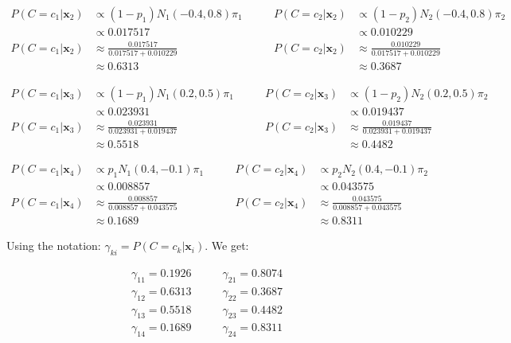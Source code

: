 \documentclass[12pt]{article}
\begin{document}
\begin{enumerate}[leftmargin=\labelsep]
    \begin{equation}
    \begin{aligned}
        P(C=c_1|\mathbf{x}_2) &\propto (1-p_1)N_1(-0.4, 0.8)\pi_1 &\qquad P(C=c_2|\mathbf{x}_2) &\propto (1-p_2)N_2(-0.4, 0.8)\pi_2 \\
        &\propto 0.017517 &\qquad &\propto 0.010229 \\
        P(C=c_1|\mathbf{x}_2) &\approx \frac{0.017517}{0.017517+0.010229} &\qquad P(C=c_2|\mathbf{x}_2) &\approx \frac{0.010229}{0.017517+0.010229} \\
        &\approx 0.6313 &\qquad &\approx 0.3687
    \end{aligned}
    \end{equation}

    \begin{equation}
    \begin{aligned}
        P(C=c_1|\mathbf{x}_3) &\propto (1-p_1)N_1(0.2, 0.5)\pi_1 &\qquad P(C=c_2|\mathbf{x}_3) &\propto (1-p_2)N_2(0.2, 0.5)\pi_2 \\
        &\propto 0.023931 &\qquad &\propto 0.019437 \\
        P(C=c_1|\mathbf{x}_3) &\approx \frac{0.023931}{0.023931+0.019437} &\qquad P(C=c_2|\mathbf{x}_3) &\approx \frac{0.019437}{0.023931+0.019437} \\
        &\approx 0.5518 &\qquad &\approx 0.4482
    \end{aligned}
    \end{equation}

    \begin{equation}
    \begin{aligned}
        P(C=c_1|\mathbf{x}_4) &\propto p_1N_1(0.4, -0.1)\pi_1 &\qquad P(C=c_2|\mathbf{x}_4) &\propto p_2N_2(0.4, -0.1)\pi_2 \\
        &\propto 0.008857 &\qquad &\propto 0.043575 \\
        P(C=c_1|\mathbf{x}_4) &\approx \frac{0.008857}{0.008857+0.043575} &\qquad P(C=c_2|\mathbf{x}_4) &\approx \frac{0.043575}{0.008857+0.043575} \\
        &\approx 0.1689 &\qquad &\approx 0.8311
    \end{aligned}
    \end{equation}

    \vskip 2cm

    Using the notation: $\gamma_{ki}=P(C = c_k |\mathbf{x}_i)$. We get:

    \begin{equation}
    \begin{aligned}
        \gamma_{11} = 0.1926 &\qquad \gamma_{21} = 0.8074 \\
        \gamma_{12} = 0.6313 &\qquad \gamma_{22} = 0.3687 \\
        \gamma_{13} = 0.5518 &\qquad \gamma_{23} = 0.4482 \\
        \gamma_{14} = 0.1689 &\qquad \gamma_{24} = 0.8311
    \end{aligned}
    \end{equation}


\end{enumerate}
\end{document}
